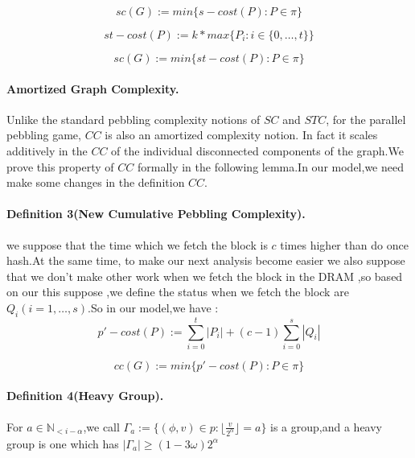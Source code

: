 \documentclass[a4paper, oneside]{article}
\begin{document}
  \begin{equation}
    sc(G):= min\{s-cost(P):P \in \pi \}
  \end{equation}

  \begin{equation}
    st-cost(P):=k*max\{ P_i:i\in \{ 0,\dots,t \} \}
  \end{equation}

  \begin{equation}
    sc(G):= min\{st-cost(P):P \in \pi \}
  \end{equation}

\paragraph{Amortized Graph Complexity.}
Unlike the standard pebbling complexity notions of $SC$ and $STC$, for the parallel pebbling game, $CC$ is also an amortized complexity notion. In fact it scales additively in the $CC$ of the individual disconnected components of the graph.We prove this property of $CC$ formally in the following lemma.In our model,we need make some changes in the definition $CC$.
\paragraph{Definition 3(New Cumulative Pebbling Complexity).}
we suppose that the time which we fetch the block is $c$ times higher than do once hash.At the same time, to make our next analysis become easier we also suppose that we don't make other work when we fetch the block in the DRAM ,so based on our this suppose ,we define the status when we fetch the block are $Q_i(i=1,\dots,s)$.So in our model,we have :
  \begin{equation}
    p'-cost(P):= \sum\limits_{i=0}^t|P_i|+(c-1)\sum\limits_{i=0}^s|Q_i|
  \end{equation}

  \begin{equation}
    cc(G):= min\{p'-cost(P):P \in \pi \}
  \end{equation}


\paragraph{Definition 4(Heavy Group).}
For $a\in \mathbb N_{<i-\alpha}$,we call $\Gamma_a :=\{(\phi,v)\in p:\lfloor \frac{v}{2^{\alpha}} \rfloor = a \}$ is a group,and a heavy group is one which has $|\Gamma_a|\ge(1-3\omega)2^{\alpha}$
\end{document}
